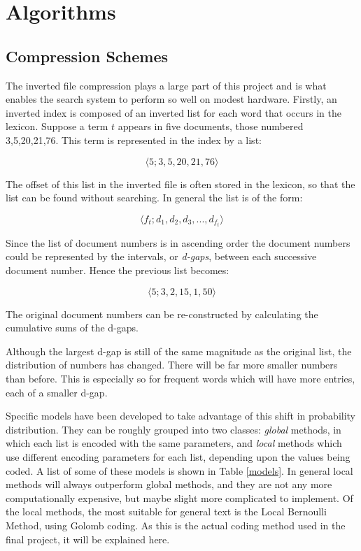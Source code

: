\section{Algorithms}
\subsection{Compression Schemes}
\label{compression}

The inverted file compression plays a large part of this project and is
what enables the search system to perform so well on modest hardware.
Firstly, an inverted index is composed of an inverted list for each word
that occurs in the lexicon.  Suppose a term $t$ appears in five documents,
those numbered 3,5,20,21,76.  This term is represented in the index by a
list:

\[
\langle 5;3,5,20,21,76 \rangle
\]

The offset of this list in the inverted file is often stored in the
lexicon, so that the list can be found without searching.  In general the
list is of the form:

\[
\langle f_t;d_1,d_2,d_3,...,d_{f_t} \rangle 
\]

Since the list of document numbers is in ascending order the document
numbers could be represented by the intervals, or \emph{d-gaps}, between
each successive document number.  Hence the previous list becomes:

\[
\langle 5;3,2,15,1,50 \rangle 
\]

The original document numbers can be re-constructed by calculating the
cumulative sums of the d-gaps.

Although the largest d-gap is still of the same magnitude as the original
list, the distribution of numbers has changed.  There will be far more
smaller numbers than before.  This is especially so for frequent words
which will have more entries, each of a smaller d-gap.

Specific models have been developed to take advantage of this shift in
probability distribution.  They can be roughly grouped into two classes:
\emph{global} methods, in which each list is encoded with the same
parameters, and \emph{local} methods which use different encoding
parameters for each list, depending upon the values being coded.  A list of some of these models is shown in Table \ref{models}. In
general local methods will always outperform global methods, and they are
not any more computationally expensive, but maybe slight more complicated
to implement.  Of the local methods, the most suitable for general text is
the Local Bernoulli Method, using Golomb coding.  As this is the actual coding method used in the final project, it will be explained here.



